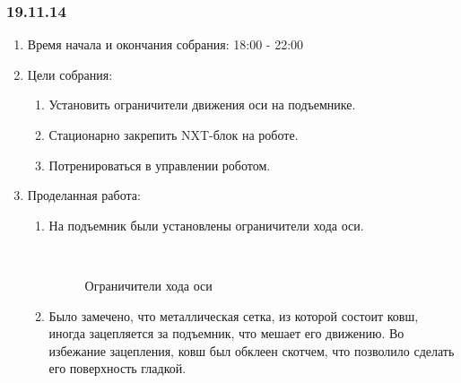 \subsubsection{19.11.14}

\begin{enumerate}
	\item Время начала и окончания собрания:
	18:00 - 22:00
	\item Цели собрания:
	\begin{enumerate}
	  \item Установить ограничители движения оси на подъемнике.
	  
	  \item Стационарно закрепить NXT-блок на роботе.
	  
	  \item Потренироваться в управлении роботом.
	  
    \end{enumerate}
	\item Проделанная работа:
	\begin{enumerate}
	  \item На подъемник были установлены ограничители хода оси.
	  
	  \begin{figure}[H]
	  	\begin{minipage}[h]{0.2\linewidth}
	  		\center  
	  	\end{minipage}
	  	\begin{minipage}[h]{0.6\linewidth}
	  		\caption{Ограничители хода оси}
	  	\end{minipage}
	  \end{figure}

      \item Было замечено, что металлическая сетка, из которой состоит ковш, иногда зацепляется за подъемник, что мешает его движению. Во избежание зацепления, ковш был обклеен скотчем, что позволило сделать его поверхность гладкой.
      

\end{enumerate}
\end{enumerate}

